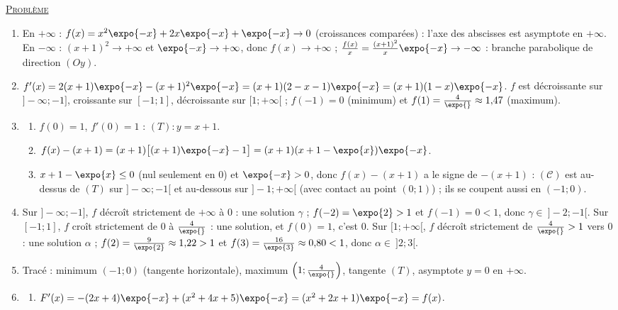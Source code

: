 \begin{corrige}
\noindent \underline{\textsc{Probl\`eme}}
\begin{enumerate}
\item En $+\infty$ : $f(x) = x^2\expo{-x} + 2x\expo{-x} + \expo{-x} \to 0$ (croissances compar\'ees) : l'axe des abscisses est asymptote en $+\infty$.
      En $-\infty$ : $(x+1)^2 \to +\infty$ et $\expo{-x} \to +\infty$, donc $f(x) \to +\infty$ ;
      $\frac{f(x)}{x} = \frac{(x+1)^2}{x}\expo{-x} \to -\infty$ : branche parabolique de direction $(Oy)$.
\item $f'(x) = 2(x+1)\expo{-x} - (x+1)^2\expo{-x} = (x+1)(2 - x - 1)\expo{-x} = (x+1)(1-x)\expo{-x}$.
      $f$ est d\'ecroissante sur $]-\infty ; -1]$, croissante sur $[-1 ; 1]$, d\'ecroissante sur $[1 ; +\infty[$ ;
      $f(-1) = 0$ (minimum) et $f(1) = \frac{4}{\expo{}} \approx 1{,}47$ (maximum).
\item \begin{enumerate}
      \item $f(0) = 1$, $f'(0) = 1$ : $(T) : y = x + 1$.
      \item $f(x) - (x+1) = (x+1)\big[(x+1)\expo{-x} - 1\big] = (x+1)(x + 1 - \expo{x})\expo{-x}$.
      \item $x + 1 - \expo{x} \leq 0$ (nul seulement en $0$) et $\expo{-x} > 0$, donc $f(x) - (x + 1)$ a le signe de $-(x+1)$ :
            $(\mathscr{C})$ est au-dessus de $(T)$ sur $]-\infty ; -1[$ et au-dessous sur $]-1 ; +\infty[$
            (avec contact au point $(0 ; 1)$) ; ils se coupent aussi en $(-1 ; 0)$.
      \end{enumerate}
\item Sur $]-\infty ; -1]$, $f$ d\'ecro\^it strictement de $+\infty$ \`a $0$ : une solution $\gamma$ ; $f(-2) = \expo{2} > 1$ et $f(-1) = 0 < 1$,
      donc $\gamma \in\ ]-2 ; -1[$. Sur $[-1 ; 1]$, $f$ cro\^it strictement de $0$ \`a $\frac{4}{\expo{}}$ : une solution, et $f(0) = 1$, c'est $0$.
      Sur $[1 ; +\infty[$, $f$ d\'ecro\^it strictement de $\frac{4}{\expo{}} > 1$ vers $0$ : une solution $\alpha$ ;
      $f(2) = \frac{9}{\expo{2}} \approx 1{,}22 > 1$ et $f(3) = \frac{16}{\expo{3}} \approx 0{,}80 < 1$, donc $\alpha \in\ ]2 ; 3[$.
\item Trac\'e : minimum $(-1 ; 0)$ (tangente horizontale), maximum $\left(1 ; \frac{4}{\expo{}}\right)$, tangente $(T)$, asymptote $y = 0$ en $+\infty$.
\item \begin{enumerate}
      \item $F'(x) = -(2x + 4)\expo{-x} + (x^2 + 4x + 5)\expo{-x} = (x^2 + 2x + 1)\expo{-x} = f(x)$.

\end{enumerate}
\end{enumerate}
\end{corrige}
